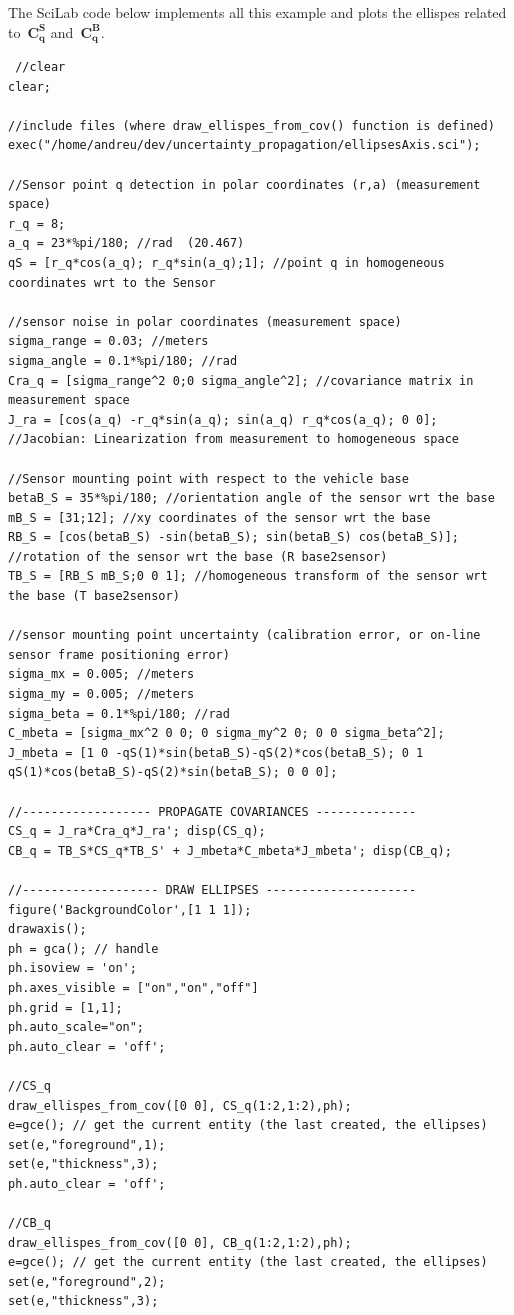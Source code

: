 The SciLab code below implements all this example and plots the ellispes related to~$\mathbf{C^S_q}$ and~$\mathbf{C^B_q}$.
\begin{mdframed}
\tiny
\begin{verbatim} 
 //clear
clear;

//include files (where draw_ellispes_from_cov() function is defined)
exec("/home/andreu/dev/uncertainty_propagation/ellipsesAxis.sci");

//Sensor point q detection in polar coordinates (r,a) (measurement space)
r_q = 8;
a_q = 23*%pi/180; //rad  (20.467)
qS = [r_q*cos(a_q); r_q*sin(a_q);1]; //point q in homogeneous coordinates wrt to the Sensor

//sensor noise in polar coordinates (measurement space) 
sigma_range = 0.03; //meters 
sigma_angle = 0.1*%pi/180; //rad 
Cra_q = [sigma_range^2 0;0 sigma_angle^2]; //covariance matrix in measurement space
J_ra = [cos(a_q) -r_q*sin(a_q); sin(a_q) r_q*cos(a_q); 0 0]; //Jacobian: Linearization from measurement to homogeneous space

//Sensor mounting point with respect to the vehicle base
betaB_S = 35*%pi/180; //orientation angle of the sensor wrt the base
mB_S = [31;12]; //xy coordinates of the sensor wrt the base
RB_S = [cos(betaB_S) -sin(betaB_S); sin(betaB_S) cos(betaB_S)]; //rotation of the sensor wrt the base (R base2sensor)
TB_S = [RB_S mB_S;0 0 1]; //homogeneous transform of the sensor wrt the base (T base2sensor)

//sensor mounting point uncertainty (calibration error, or on-line sensor frame positioning error)
sigma_mx = 0.005; //meters
sigma_my = 0.005; //meters
sigma_beta = 0.1*%pi/180; //rad
C_mbeta = [sigma_mx^2 0 0; 0 sigma_my^2 0; 0 0 sigma_beta^2];
J_mbeta = [1 0 -qS(1)*sin(betaB_S)-qS(2)*cos(betaB_S); 0 1 qS(1)*cos(betaB_S)-qS(2)*sin(betaB_S); 0 0 0];

//------------------ PROPAGATE COVARIANCES --------------
CS_q = J_ra*Cra_q*J_ra'; disp(CS_q);
CB_q = TB_S*CS_q*TB_S' + J_mbeta*C_mbeta*J_mbeta'; disp(CB_q);

//------------------- DRAW ELLIPSES ---------------------
figure('BackgroundColor',[1 1 1]);
drawaxis();
ph = gca(); // handle
ph.isoview = 'on';
ph.axes_visible = ["on","on","off"]
ph.grid = [1,1];
ph.auto_scale="on";
ph.auto_clear = 'off';

//CS_q
draw_ellispes_from_cov([0 0], CS_q(1:2,1:2),ph);
e=gce(); // get the current entity (the last created, the ellipses)
set(e,"foreground",1);
set(e,"thickness",3);
ph.auto_clear = 'off';

//CB_q
draw_ellispes_from_cov([0 0], CB_q(1:2,1:2),ph);
e=gce(); // get the current entity (the last created, the ellipses)
set(e,"foreground",2);
set(e,"thickness",3);
\end{verbatim}
\end{mdframed}

